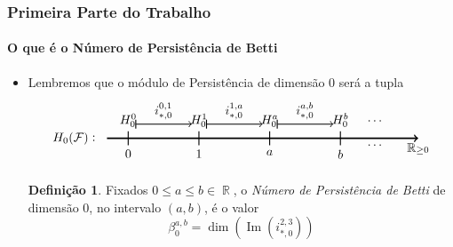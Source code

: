 \documentclass[11pt]{beamer}
\DeclareMathOperator{\R}{\mathbb{R}}
\DeclareMathOperator {\Imagem}{ Im }
\theoremstyle{remark}
\theoremstyle{definition}
\newtheorem{definicao}{Definição}
\theoremstyle{plain}
\begin{document}
    \begin{frame}
        \frametitle{Primeira Parte do Trabalho}
        \framesubtitle{O que é o Número de Persistência de Betti}
        \begin{itemize}
            \item
                Lembremos que o módulo de Persistência de dimensão
                $0$ será a tupla
                \[
                    \begin{tikzpicture}[scale=2]
                        \begin{scope}
                            \draw[->, very thick] (-0.3,0) -- (4.1,0) node[right, below]
                                {$\R_{\geq 0}$};
                            \node[left] at (-0.5,0) {$H_0(\mathcal{F})$};
                            \node[left] at (-0.4,0) {:};

                            \node[above] at (0,0.1) {$H_0^0$};
                            \node[above] at (1,0.1) {$H_0^1$};
                            \node[above] at (2,0.1) {$H_0^a$};
                            \node[above] at (3,0.1) {$H_0^b$};
                            \node[above] at (3.5,0.14) {$\cdots$};
                            \node[above] at (3.5,-0.2) {$\cdots$};
                            
                            \draw[-, thick] (0,0.1) --  (0,-0.1) node[below] {$0$}; 
                            \draw[-, thick] (1,0.1) --  (1,-0.1) node[below] {$1$}; 
                            \draw[-, thick] (2,0.1) --  (2,-0.1) node[below] {$a$}; 
                            \draw[-, thick] (3,0.1) --  (3,-0.1) node[below] {$b$}; 

                            \draw[ |->, thick] (0.1, 0.2) -- (0.9, 0.2) node[midway, above]
                                {$i_{\ast, 0}^{0,1}$};
                            \draw[ |->, thick] (1.1, 0.2) -- (1.9, 0.2) node[midway, above]
                                {$i_{\ast, 0}^{1,a}$};
                            \draw[ |->, thick] (2.1, 0.2) -- (2.9, 0.2) node[midway, above]
                                {$i_{\ast, 0}^{a,b}$};
                        \end{scope}
                    \end{tikzpicture}
                \]

                \begin{definicao}
                    Fixados $0 \leq a \leq b \in \R$, o \emph{Número
                    de Persistência de Betti} de dimensão $0$, no intervalo $(a,b)$,
                    é o valor
                    \begin{equation*}
                        \beta_0^{a,b} = \dim( \Imagem(i_{\ast, 0}^{2,3}) )
                    \end{equation*}
                \end{definicao}
        \end{itemize}
    \end{frame}
\end{document}
